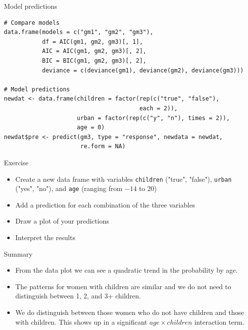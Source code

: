 \documentclass[aspectratio=169]{beamer}
\begin{document}
\begin{frame}[fragile]{Model predictions}
\begin{lstlisting}
# Compare models
data.frame(models = c("gm1", "gm2", "gm3"),
           df = AIC(gm1, gm2, gm3)[, 1],
           AIC = AIC(gm1, gm2, gm3)[, 2],
           BIC = BIC(gm1, gm2, gm3)[, 2],
           deviance = c(deviance(gm1), deviance(gm2), deviance(gm3)))

# Model predictions
newdat <- data.frame(children = factor(rep(c("true", "false"),
                                       each = 2)),
                     urban = factor(rep(c("y", "n"), times = 2)),
                     age = 0)
newdat$pre <- predict(gm3, type = "response", newdata = newdat,
                      re.form = NA)
\end{lstlisting}
\end{frame}

\begin{frame}{}
  \begin{block}{Exercise}
    \begin{itemize}
      \item Create a new data frame with variables \texttt{children} ("true",
        "false"), \texttt{urban} ("yes", "no"), and \texttt{age} (ranging from
        $-14$ to 20)
      \item Add a prediction for each combination of the three variables
      \item Draw a plot of your predictions
      \item Interpret the results
    \end{itemize}
  \end{block}
\end{frame}

\begin{frame}{Summary}
  \begin{itemize}
    \item From the data plot we can see a quadratic trend in the probability by
      age.
    \item The patterns for women with children are similar and we do not need to
      distinguish between 1, 2, and 3+ children.
    \item We do distinguish between those women who do not have children and
      those with children. This shows up in a significant $age \times children$
      interaction term.
  \end{itemize}
\end{frame}

\end{document}
